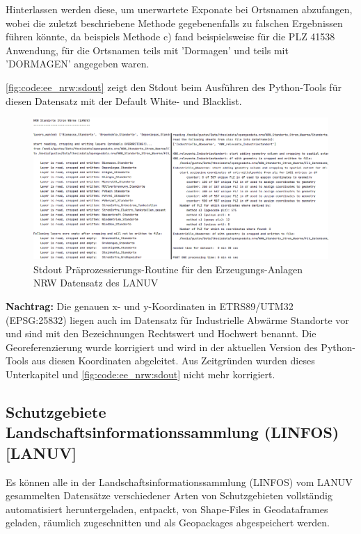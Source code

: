 			Hinterlassen werden diese, um unerwartete Exponate bei Ortsnamen abzufangen, wobei die zuletzt beschriebene Methode gegebenenfalls zu falschen Ergebnissen führen könnte, da beispiels
			Methode c) fand beispielsweise für die PLZ 41538 Anwendung, für die Ortsnamen teils mit 'Dormagen' und teils mit 'DORMAGEN' angegeben waren.

			\autoref{fig:code:ee_nrw:sdout} zeigt den Stdout beim Ausführen des Python-Tools für diesen Datensatz mit der Default White- und Blacklist.\\
			
			\begin{figure}[h]
				\centering
				\includegraphics[width=\linewidth]{./Medien/own/ee_nrw/ee_nrw_sdout.png}
				\caption{Stdout Präprozessierungs-Routine für den Erzeugungs-Anlagen NRW Datensatz des LANUV}
				\label{fig:code:ee_nrw:sdout}
			\end{figure}
			
			\textbf{Nachtrag:} Die genauen x- und y-Koordinaten in ETRS89/UTM32 (EPSG:25832) liegen auch im Datensatz für Industrielle Abwärme Standorte vor und sind mit den Bezeichnungen Rechtswert und Hochwert benannt. Die Georeferenzierung wurde korrigiert und wird in der aktuellen Version des Python-Tools aus diesen Koordinaten abgeleitet. Aus Zeitgründen wurden dieses Unterkapitel und \autoref{fig:code:ee_nrw:sdout} nicht mehr korrigiert. 
			
			
		\subsection{Schutzgebiete Landschaftsinformationssammlung (LINFOS) [LANUV]}	
			Es können alle in der Landschaftsinformationssammlung (LINFOS) vom LANUV gesammelten Datensätze verschiedener Arten von Schutzgebieten vollständig automatisiert heruntergeladen, entpackt, von Shape-Files in Geodataframes geladen, räumlich zugeschnitten und als Geopackages abgespeichert werden. 
			
